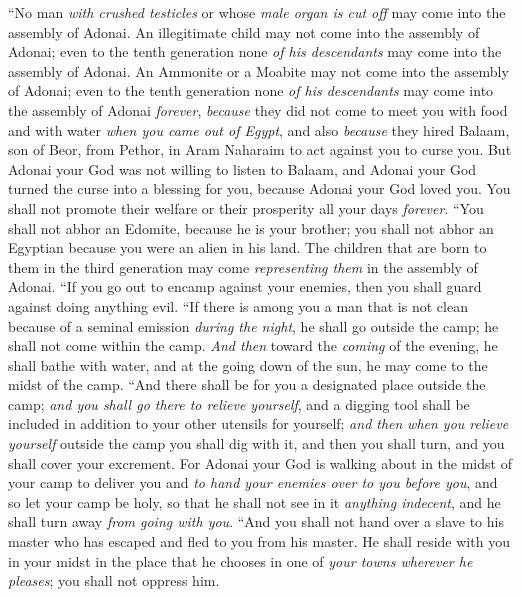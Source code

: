 \begin{biblechapter} %
\verse “No man \textit{with crushed testicles} or whose \textit{male organ is cut off} may come into the assembly of Adonai.
\verse An illegitimate child may not come into the assembly of Adonai; even to the tenth generation none \textit{of his descendants} may come into the assembly of Adonai.
\verse An Ammonite or a Moabite may not come into the assembly of Adonai; even to the tenth generation none \textit{of his descendants} may come into the assembly of Adonai \textit{forever},
\verse \textit{because} they did not come to meet you with food and with water \textit{when you came out of Egypt}, and also \textit{because} they hired Balaam, son of Beor, from Pethor, in Aram Naharaim to act against you to curse you.
\verse But Adonai your God was not willing to listen to Balaam, and Adonai your God turned the curse into a blessing for you, because Adonai your God loved you.
\verse You shall not promote their welfare or their prosperity all your days \textit{forever}.
\verse “You shall not abhor an Edomite, because he is your brother; you shall not abhor an Egyptian because you were an alien in his land.
\verse The children that are born to them in the third generation may come \textit{representing them} in the assembly of Adonai.
\verse “If you go out to encamp against your enemies, then you shall guard against doing anything evil.
\verse “If there is among you a man that is not clean because of a seminal emission \textit{during the night}, he shall go outside the camp; he shall not come within the camp.
\verse \textit{And then} toward the \textit{coming} of the evening, he shall bathe with water, and at the going down of the sun, he may come to the midst of the camp.
\verse “And there shall be for you a designated place outside the camp; \textit{and you shall go there to relieve yourself},
\verse and a digging tool shall be included in addition to your other utensils for yourself; \textit{and then} \textit{when you relieve yourself} outside the camp you shall dig with it, and then you shall turn, and you shall cover your excrement.
\verse For Adonai your God is walking about in the midst of your camp to deliver you and \textit{to hand your enemies over to you before you}, and so let your camp be holy, so that he shall not see in it \textit{anything indecent}, and he shall turn away \textit{from going with you}.
\verse “And you shall not hand over a slave to his master who has escaped and fled to you from his master.
\verse He shall reside with you in your midst in the place that he chooses in one of \textit{your towns wherever he pleases}; you shall not oppress him.

\end{biblechapter}
